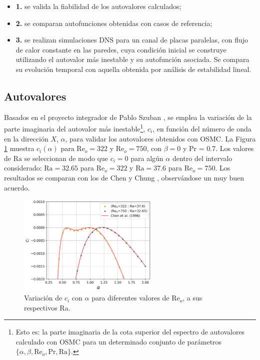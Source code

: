 \begin{itemize}
	\item \textbf{1.} se valida la fiabilidad de los autovalores calculados;
	\item \textbf{2.} se comparan autofunciones obtenidas con casos de referencia;
	\item \textbf{3.} se realizan simulaciones DNS para un canal de placas paralelas, con flujo de calor constante en las paredes, cuya condición inicial se construye utilizando el autovalor más inestable y su autofunción asociada. Se compara su evolución temporal con aquella obtenida por análisis de estabilidad lineal.
\end{itemize}

\subsection{Autovalores}

Basados en el proyecto integrador de Pablo Szuban \cite{szuban2023}, se emplea la variación de la parte imaginaria del autovalor más inestable\footnote{Esto es: la parte imaginaria de la cota superior del espectro de autovalores calculado con OSMC para un determinado conjunto de parámetros $\lbrace \alpha, \beta, \text{Re}_o, \text{Pr}, \text{Ra} \rbrace$.}, $c_i$, en función del número de onda en la dirección $X$, $\alpha$, para validar los autovalores obtenidos con OSMC. La Figura \ref{fig:eigenval_alpha} muestra $c_i(\alpha)$ para $\mathrm{Re}_o=322$ y $\mathrm{Re}_o=750$, con $\beta=0$ y Pr = 0.7. Los valores de $\mathrm{Ra}$ se seleccionan de modo que $c_i=0$ para algún $\alpha$ dentro del intervalo considerado: $\mathrm{Ra}=32$.$65$ para $\mathrm{Re}_o=322$ y $\mathrm{Ra}=37$.$6$ para $\mathrm{Re}_o=750$. Los resultados se comparan con los de Chen y Chung \cite{chen1996linear}, observándose un muy buen acuerdo.

\begin{figure}[H]
	 \centering
    	\includegraphics[width=0.6\textwidth]{figures/cap4/osmc/eigenvalues.png}
	 \caption{Variación de $c_i$ con $\alpha$ para diferentes valores de Re$_o$, a sus respectivos Ra.} 
 \label{fig:eigenval_alpha}
\end{figure}


